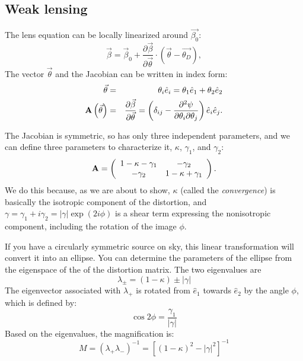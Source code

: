 \subsection{Weak lensing}

The lens equation can be locally linearized  around $\vec{\beta_0}$:
\begin{equation}
\vec{\beta} = \vec{\beta}_0
+ \frac{\partial \vec{\beta}}{\partial \vec{\theta}} \cdot \left(\vec{\theta}
- \vec{\theta_D} \right), 
\end{equation}
The vector $\vec{\theta}$ and the Jacobian can be written in index form:
\begin{eqnarray}
\vec{\theta} &=& \theta_i {\hat e}_i = \theta_1 {\hat e}_1
+ \theta_2 {\hat e}_2 \cr
{\bf A}\left(\vec{\theta}\right) &=& 
\frac{\partial \vec{\beta}}{\partial \vec{\theta}} = \left(\delta_{ij}
- \frac{\partial^2 \psi}{\partial\theta_i \partial\theta_j}\right)
{\hat e}_i {\hat e}_j.
\end{eqnarray}

The Jacobian is symmetric, so has only three independent parameters,
and we can define three parameters to characterize it, $\kappa$,
$\gamma_1$, and $\gamma_2$:
\begin{equation}
{\bf A} = \left(\begin{array}{cc}
1-\kappa - \gamma_1 & -\gamma_2 \cr
- \gamma_2 & 1-\kappa + \gamma_1
\end{array}\right).
\end{equation}
We do this because, as we are about to show, $\kappa$ (called the {\it
convergence}) is basically the isotropic component of the distortion,
and $\gamma = \gamma_1 + i\gamma_2 = |\gamma| \exp(2i\phi)$ is a shear
term expressing the nonisotropic component, including the rotation of
the image $\phi$.

If you have a circularly symmetric source on sky, this linear
transformation will convert it into an ellipse. You can determine the
parameters of the ellipse from the eigenspace of the of the distortion
matrix. The two eigenvalues are
\begin{equation}
\lambda_{\pm} = (1-\kappa) \pm |\gamma|
\end{equation}
The eigenvector associated with $\lambda_+$ is rotated from ${\hat
e}_1$ towards ${\hat e}_2$ by the angle $\phi$, which is defined by:
\begin{equation}
\cos 2\phi = \frac{\gamma_1}{|\gamma|}
\end{equation}
Based on the eigenvalues, the magnification is:
\begin{equation}
M = \left(\lambda_+ \lambda_-\right)^{-1} = \left[(1-\kappa)^2 -
|\gamma|^2\right]^{-1} 
\end{equation}

